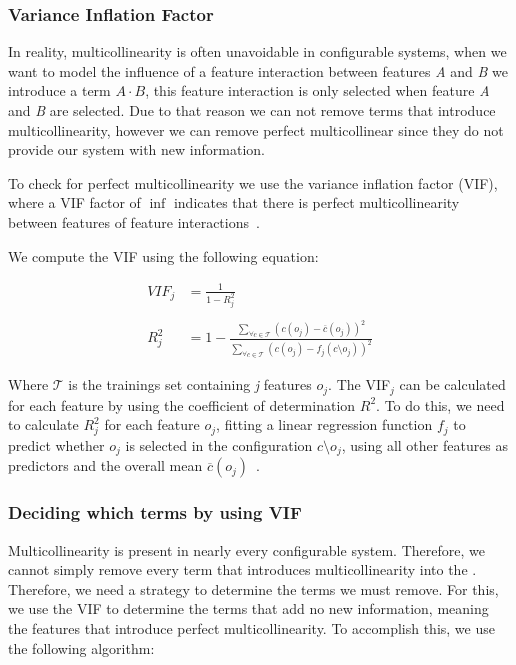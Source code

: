 
\subsubsection{Variance Inflation Factor}\label{ch:vif}
In reality, multicollinearity is often unavoidable in configurable systems, when we want to model the influence of a feature interaction between features
\textit{A} and \textit{B} we introduce a term $A \cdot B$, this feature interaction is only selected when feature \textit{A} and \textit{B} are selected. 
Due to that reason we can not remove terms that introduce multicollinearity, however we can remove perfect multicollinear since they do not provide our 
system with new information.

To check for perfect multicollinearity we use the variance inflation factor (VIF), where a VIF factor of $\inf$ indicates
that there is perfect multicollinearity between features of feature interactions~\cite{Multicollinearity}.

We compute the VIF using the following equation:

\begin{align}
    VIF_{j} &= \frac{1}{1 - R^{2}_{j}}  \\ \nonumber\\
    R^{2}_{j} &= 1 - \frac{\sum\limits_{\forall c \in \mathcal{T}} (c(o_j) - \overline{c}(o_j))^2} {\sum\limits_{\forall c \in \mathcal{T}}(c(o_j) - f_j(c \setminus o_j))^2}
\end{align}

Where $\mathcal{T}$ is the trainings set containing \textit{j} features $o_j$. The VIF$_{j}$ can be calculated for each feature by using the coefficient
of determination $R^2$. To do this, we need to calculate $R^{2}_j$ for each feature $o_j$, fitting a linear regression function $f_j$ to predict whether $o_j$
is selected in the configuration $c \setminus o_j$, using all other features as predictors and the overall mean $\overline{c}(o_j)$~\cite{Multicollinearity}.

\subsubsection{Deciding which terms by using VIF}
Multicollinearity is present in nearly every configurable system. 
Therefore, we cannot simply remove every term that introduces multicollinearity into the {\perfInfluenceModel}. 
Therefore, we need a strategy to determine the terms we must remove. For this, we use the VIF to determine the terms that add no new information, 
meaning the features that introduce perfect multicollinearity. To accomplish this, we use the following algorithm:

